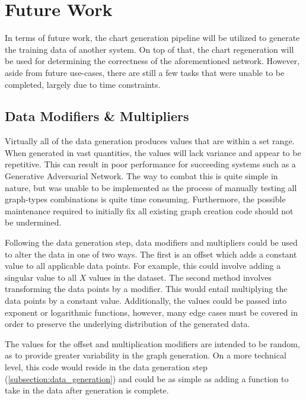 \chapter{Future Work}
In terms of future work, the chart generation pipeline will be utilized to generate the training data of another system. On top of that, the chart regeneration will be used for determining the correctness of the aforementioned network. However, aside from future use-cases, there are still a few tasks that were unable to be completed, largely due to time constraints.

\section{Data Modifiers \& Multipliers}
Virtually all of the data generation produces values that are within a set range. When generated in vast quantities, the values will lack variance and appear to be repetitive. This can result in poor performance for succeeding systems such as a Generative Adversarial Network. The way to combat this is quite simple in nature, but was unable to be implemented as the process of manually testing all graph-types combinations is quite time consuming. Furthermore, the possible maintenance required to initially fix all existing graph creation code should not be undermined.

\hfill

Following the data generation step, data modifiers and multipliers could be used to alter the data in one of two ways. The first is an offset which adds a constant value to all applicable data points. For example, this could involve adding a singular value to all \(X\) values in the dataset. The second method involves transforming the data points by a modifier. This would entail multiplying the data points by a constant value. Additionally, the values could be passed into exponent or logarithmic functions, however, many edge cases must be covered in order to preserve the underlying distribution of the generated data. 

\hfill

The values for the offset and multiplication modifiers are intended to be random, as to provide greater variability in the graph generation. On a more technical level, this code would reside in the data generation step (\autoref{subsection:data_generation}) and could be as simple as adding a function to take in the data after generation is complete.

